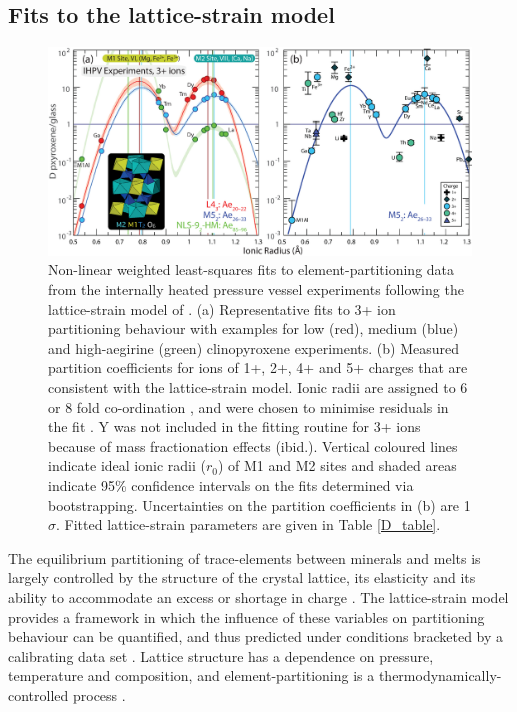 \documentclass[review,authoryear,12pt]{elsarticle}
\begin{document}
\subsection{Fits to the lattice-strain model}

        \begin{figure}[tb]
        \begin{center}
        \includegraphics[width=1\textwidth]{8_Latticestrain-01.eps}
        \caption[Lattice-strain fits to  element-partition coefficients]{Non-linear weighted least-squares fits to element-partitioning data from the internally heated pressure vessel experiments following the lattice-strain model of \citet{Blundy1994}. (a) Representative fits to 3+ ion partitioning behaviour with examples for low (red), medium (blue) and high-aegirine (green) clinopyroxene experiments. (b) Measured partition coefficients for ions of 1+, 2+, 4+ and 5+ charges that are consistent with the lattice-strain model. Ionic radii are assigned to 6 or 8 fold co-ordination \citep{Shannon1976}, and were chosen to minimise residuals in the fit \citep[cf.][]{Olin2010}. Y was not included in the fitting routine for 3+ ions because of mass fractionation effects (ibid.).
        Vertical coloured lines indicate ideal ionic radii ($r_0$) of M1 and M2 sites and shaded areas indicate 95\% confidence intervals on the fits determined via bootstrapping. Uncertainties on the partition coefficients in (b) are 1$\sigma$. Fitted lattice-strain parameters are given in Table \ref{D_table}.}
        \label{8_Latticestrain3}
        \end{center}
        \end{figure}

The equilibrium partitioning of trace-elements between minerals and melts is largely controlled by the structure of the crystal lattice, its elasticity \citep{Onuma1968, Kumazawa1969, Weidner1982} and its ability to accommodate an excess or shortage in charge \citep{Blundy1998, Wood2001charge, Hanchar2001, Corgne2005CMP}. The lattice-strain model provides a framework in which the influence of these variables on partitioning behaviour can be quantified, and thus predicted under conditions bracketed by a calibrating data set \citep{Onuma1968, Blundy1994, Wood2014}. Lattice structure has a dependence on pressure, temperature and composition, and element-partitioning is a thermodynamically-controlled process \citep[e.g.][]{Wood1997}.
\end{document}
